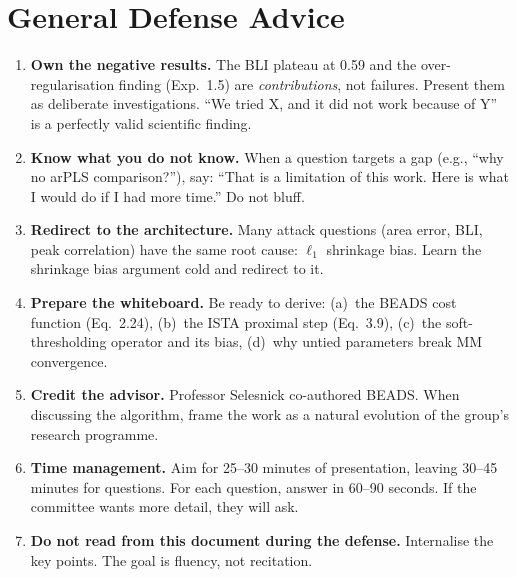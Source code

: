 \documentclass[11pt, letterpaper]{article}
\begin{document}
\newpage
\section*{General Defense Advice}

\begin{tcolorbox}[
  enhanced,
  colback=blue!3!white,
  colframe=SectionBlue,
  fonttitle=\bfseries\sffamily,
  title={Guiding Principles for the Defense},
  coltitle=white,
  attach boxed title to top center={yshift=-2mm},
  boxed title style={colback=SectionBlue, colframe=SectionBlue, sharp corners, size=small},
  left=6pt, right=6pt, top=6pt, bottom=6pt
]

\begin{enumerate}[leftmargin=*, itemsep=8pt]

\item \textbf{Own the negative results.}
The BLI plateau at 0.59 and the over-regularisation finding (Exp.~1.5)
are \emph{contributions}, not failures.  Present them as deliberate
investigations.  ``We tried X, and it did not work because of Y'' is a
perfectly valid scientific finding.

\item \textbf{Know what you do not know.}
When a question targets a gap (e.g., ``why no arPLS comparison?''),
say: ``That is a limitation of this work.  Here is what I would do
if I had more time.''  Do not bluff.

\item \textbf{Redirect to the architecture.}
Many attack questions (area error, BLI, peak correlation) have the same
root cause: $\ell_1$ shrinkage bias.  Learn the shrinkage bias argument
cold and redirect to it.

\item \textbf{Prepare the whiteboard.}
Be ready to derive:
(a)~the BEADS cost function (Eq.~2.24),
(b)~the ISTA proximal step (Eq.~3.9),
(c)~the soft-thresholding operator and its bias,
(d)~why untied parameters break MM convergence.

\item \textbf{Credit the advisor.}
Professor Selesnick co-authored BEADS.  When discussing the algorithm,
frame the work as a natural evolution of the group's research programme.

\item \textbf{Time management.}
Aim for 25--30 minutes of presentation, leaving 30--45 minutes for
questions.  For each question, answer in 60--90 seconds.  If the
committee wants more detail, they will ask.

\item \textbf{Do not read from this document during the defense.}
Internalise the key points.  The goal is fluency, not recitation.

\end{enumerate}
\end{tcolorbox}
\end{document}
